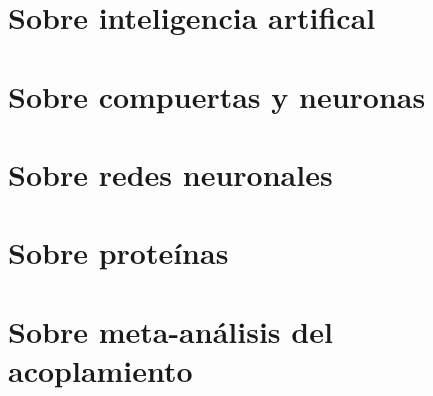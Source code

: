 \documentclass[letterpaper,12pt]{book}
\begin{document}
\frontmatter
    
    \tableofcontents
    

\mainmatter
    \chapter{Sobre inteligencia artifical}
        
    \chapter{Sobre compuertas y neuronas}
        
    \chapter{Sobre redes neuronales}
        
    \chapter{Sobre proteínas}
        
    \chapter{Sobre meta-análisis del acoplamiento}
        




\backmatter
    \nocite{*}
    \printbibliography
\end{document}

